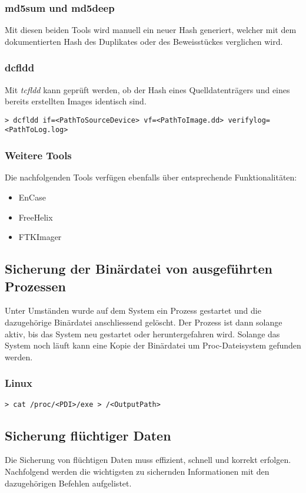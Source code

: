 \subsubsection{md5sum und md5deep}
Mit diesen beiden Tools wird manuell ein neuer Hash generiert, welcher mit dem dokumentierten Hash des Duplikates oder des Beweisstückes verglichen wird.

\subsubsection{dcfldd}
Mit \textit{tcfldd} kann geprüft werden, ob der Hash eines Quelldatenträgers und eines bereits erstellten Images identisch sind.

\begin{lstlisting}
> dcfldd if=<PathToSourceDevice> vf=<PathToImage.dd> verifylog=<PathToLog.log>
\end{lstlisting}

\subsubsection{Weitere Tools}
Die nachfolgenden Tools verfügen ebenfalls über entsprechende Funktionalitäten:

\begin{itemize}
\item EnCase
\item FreeHelix
\item FTKImager
\end{itemize}


\subsection{Sicherung der Binärdatei von ausgeführten Prozessen}
Unter Umständen wurde auf dem System ein Prozess gestartet und die dazugehörige Binärdatei anschliessend gelöscht. Der Prozess ist dann solange aktiv, bis das System neu gestartet oder heruntergefahren wird. Solange das System noch läuft kann eine Kopie der Binärdatei um Proc-Dateisystem gefunden werden.

\subsubsection{Linux}
\begin{lstlisting}
> cat /proc/<PDI>/exe > /<OutputPath>
\end{lstlisting}



\subsection{Sicherung flüchtiger Daten}
Die Sicherung von flüchtigen Daten muss effizient, schnell und korrekt erfolgen. Nachfolgend werden die wichtigsten zu sichernden Informationen mit den dazugehörigen Befehlen aufgelistet.


